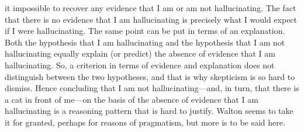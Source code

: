\documentclass[12pt,a4paper]{article}
\begin{document}
it impossible to recover any evidence that I am or am not hallucinating. The fact that there is no
evidence that I am hallucinating is precisely what I would expect if I
were hallucinating. The same point can be put in terms of an explanation. 
Both the hypothesis that I am hallucinating and the hypothesis that I am not hallucinating 
equally explain (or predict) the absence of evidence that I am hallucinating.
So, a criterion in terms of evidence and explanation does not distinguish between the two hypotheses, and that is why skepticism is so hard to dismiss.
Hence concluding that I am not hallucinating---and, in turn, that 
there is a cat in front of me---on the basis of the absence of evidence that I am hallucinating is a reasoning pattern that is hard to justify. Walton seems to take it for granted, perhaps for reasons of pragmatism, but more is to be said here. 


\end{document}
